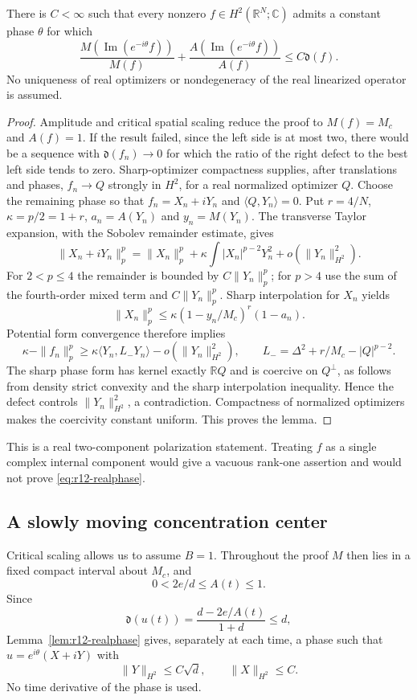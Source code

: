 \begin{lemma}
\label{lem:r12-realphase}
There is $C<\infty$ such that every nonzero $f\in H^2(\mathbb R^N;\mathbb C)$
admits a constant phase $\theta$ for which
\begin{equation}\label{eq:r12-realphase}
 \frac{M(\operatorname{Im}(e^{-i\theta}f))}{M(f)}+
 \frac{A(\operatorname{Im}(e^{-i\theta}f))}{A(f)}
 \le C\mathfrak d(f).
\end{equation}
No uniqueness of real optimizers or nondegeneracy of the real linearized
operator is assumed.
\end{lemma}
\begin{proof}
Amplitude and critical spatial scaling reduce the proof to $M(f)=M_c$
and $A(f)=1$. If the result failed, since the left side is at most two,
there would be a sequence with $\mathfrak d(f_n)\to0$ for which the ratio
of the right defect to the best left side tends to zero. Sharp-optimizer
compactness supplies, after translations and phases,
$f_n\to Q$ strongly in $H^2$, for a real normalized optimizer $Q$.
Choose the remaining phase so that $f_n=X_n+iY_n$ and
$\langle Q,Y_n\rangle=0$.
Put $r=4/N$, $\kappa=p/2=1+r$, $a_n=A(Y_n)$ and $y_n=M(Y_n)$.
The transverse Taylor expansion, with the Sobolev remainder estimate,
gives
\[
 \|X_n+iY_n\|_p^p
 =\|X_n\|_p^p+\kappa\int |X_n|^{p-2}Y_n^2
       +o(\|Y_n\|_{H^2}^2).
\]
For $2<p\le4$ the remainder is bounded by $C\|Y_n\|_p^p$;
for $p>4$ use the sum of the fourth-order mixed term and
$C\|Y_n\|_p^p$. Sharp interpolation for $X_n$ yields
\[
 \|X_n\|_p^p\le\kappa(1-y_n/M_c)^r(1-a_n).
\]
Potential form convergence therefore implies
\[
 \kappa-\|f_n\|_p^p
 \ge\kappa\langle Y_n,L_-Y_n\rangle-o(\|Y_n\|_{H^2}^2),
 \qquad L_-=\Delta^2+r/M_c-|Q|^{p-2}.
\]
The sharp phase form has kernel exactly $\mathbb RQ$ and is coercive
on $Q^\perp$, as follows from density strict convexity and the sharp
interpolation inequality. Hence the defect controls
$\|Y_n\|_{H^2}^2$, a contradiction. Compactness of normalized optimizers
makes the coercivity constant uniform. This proves the lemma.
\end{proof}

This is a real two-component polarization statement. Treating $f$ as a
single complex internal component would give a vacuous rank-one assertion
and would not prove \eqref{eq:r12-realphase}.

\subsection{A slowly moving concentration center}
Critical scaling allows us to assume $B=1$. Throughout the proof $M$ then
lies in a fixed compact interval about $M_c$, and
\begin{equation}\label{eq:r12-Arange}
 0<2e/d\le A(t)\le1.
\end{equation}
Since
\[
 \mathfrak d(u(t))=\frac{d-2e/A(t)}{1+d}\le d,
\]
Lemma~\ref{lem:r12-realphase} gives, separately at each time, a phase
such that $u=e^{i\theta}(X+iY)$ with
\begin{equation}\label{eq:r12-phase-small}
 \|Y\|_{H^2}\le C\sqrt d,\qquad \|X\|_{H^2}\le C.
\end{equation}
No time derivative of the phase is used.

